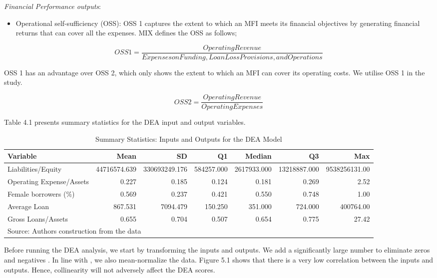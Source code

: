 \documentclass[a4paper, nobind]{templates/ociamthesis}
\providecommand{\tightlist}{%
  \setlength{\itemsep}{0pt}\setlength{\parskip}{0pt}}
\begin{document}
\emph{Financial Performance outputs}:

\begin{itemize}
\tightlist
\item
  Operational self-sufficiency (OSS): OSS 1 captures the extent to which an MFI meets its financial objectives by generating financial returns that can cover all the expenses. MIX defines the OSS as follows;
\end{itemize}

\begin{equation}
OSS1 = \frac{Operating Revenue}{Expenses on Funding, Loan Loss Provisions, and Operations}
\end{equation}

OSS 1 has an advantage over OSS 2, which only shows the extent to which an MFI can cover its operating costs. We utilise OSS 1 in the study.

\begin{equation}
OSS2 = \frac{Operating Revenue}{Operating Expenses}
\end{equation}

Table 4.1 presents summary statistics for the DEA input and output variables.

\begin{table}

\caption{\label{tab:unnamed-chunk-109}Summary Statistics: Inputs and Outputs for the DEA Model}
\centering
\fontsize{9}{11}\selectfont
\begin{tabular}[t]{lrrrrrr}
\toprule
Variable & Mean & SD & Q1 & Median & Q3 & Max\\
\midrule
Liabilities/Equity & 44716574.639 & 330693249.176 & 584257.000 & 2617933.000 & 13218887.000 & 9538256131.00\\
Operating Expense/Assets & 0.227 & 0.185 & 0.124 & 0.181 & 0.269 & 2.52\\
Female borrowers (\%) & 0.569 & 0.237 & 0.421 & 0.550 & 0.748 & 1.00\\
Average Loan & 867.531 & 7094.479 & 150.250 & 351.000 & 724.000 & 400764.00\\
Gross Loans/Assets & 0.655 & 0.704 & 0.507 & 0.654 & 0.775 & 27.42\\
\bottomrule
\multicolumn{7}{l}{\rule{0pt}{1em}Source: Authors construction from the data}\\
\end{tabular}
\end{table}

Before running the DEA analysis, we start by transforming the inputs and outputs. We add a significantly large number to eliminate zeros and negatives \autocite{ataullah2006economic}. In line with \textcite{avkiran2006productivity}, we also mean-normalize the data. Figure 5.1 shows that there is a very low correlation between the inputs and outputs. Hence, collinearity will not adversely affect the DEA scores.
\end{document}
